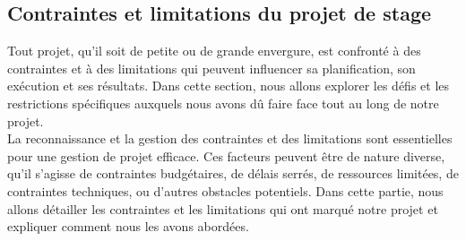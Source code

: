 \documentclass[a4paper, 12pt, french]{article}
\begin{document}
					


				
				\subsection{Contraintes et limitations du projet de stage}
					Tout projet, qu'il soit de petite ou de grande envergure, est confronté à des contraintes et à des limitations qui peuvent influencer sa planification, son exécution et ses résultats. Dans cette section, nous allons explorer les défis et les restrictions spécifiques auxquels nous avons dû faire face tout au long de notre projet.\\

					La reconnaissance et la gestion des contraintes et des limitations sont essentielles pour une gestion de projet efficace. Ces facteurs peuvent être de nature diverse, qu'il s'agisse de contraintes budgétaires, de délais serrés, de ressources limitées, de contraintes techniques, ou d'autres obstacles potentiels. Dans cette partie, nous allons détailler les contraintes et les limitations qui ont marqué notre projet et expliquer comment nous les avons abordées.\\
\end{document}
